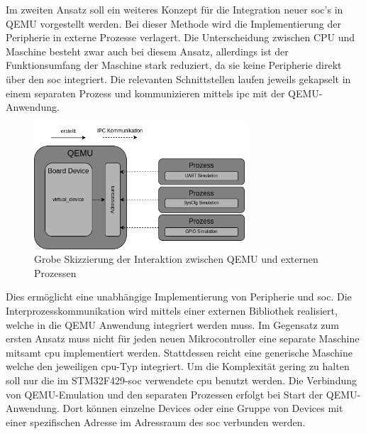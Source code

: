 Im zweiten Ansatz soll ein weiteres Konzept für die Integration neuer
\ac{soc}'s in QEMU vorgestellt werden.
Bei dieser Methode wird die Implementierung der Peripherie in externe Prozesse
verlagert.
Die Unterscheidung zwischen CPU und Maschine besteht zwar auch bei diesem
Ansatz, allerdings ist der Funktionsumfang der Maschine stark reduziert, da sie
keine Peripherie direkt über den \ac{soc} integriert.
Die relevanten Schnittstellen laufen jeweils gekapselt in einem separaten
Prozess und kommunizieren mittels \ac{ipc} mit der QEMU-Anwendung.
\begin{figure}[!htb]
    \centering
    \includegraphics[width=0.7\textwidth]{anlagen/bilder/Qemu_external_device}
    \caption{Grobe Skizzierung der Interaktion zwischen QEMU und externen Prozessen}
    \label{fig:QemuExternalDeviceErweiterung}
\end{figure}
Dies ermöglicht eine unabhängige Implementierung von Peripherie und \ac{soc}.
Die Interprozesskommunikation wird mittels einer externen Bibliothek
realisiert, welche in die QEMU Anwendung integriert werden muss.
Im Gegensatz zum ersten Ansatz muss nicht für jeden neuen Mikrocontroller eine
separate Maschine mitsamt \ac{cpu} implementiert werden.
Stattdessen reicht eine generische Maschine welche den jeweiligen \ac{cpu}-Typ
integriert.
Um die Komplexität gering zu halten soll nur die im STM32F429-\ac{soc}
verwendete \ac{cpu} benutzt werden.
Die Verbindung von QEMU-Emulation und den separaten Prozessen erfolgt bei Start
der QEMU-Anwendung.
Dort können einzelne Devices oder eine Gruppe von Devices mit einer
spezifischen Adresse im Adressraum des \ac{soc} verbunden werden.

